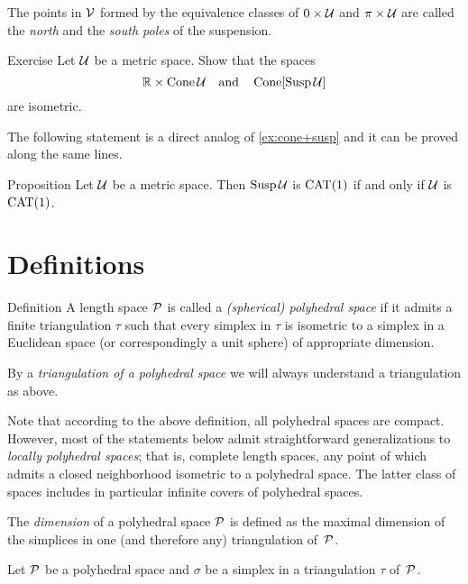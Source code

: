 The points in $\mathcal{V}$ formed by the equivalence classes of $0\times\mathcal{U}$ and $\pi\times\mathcal{U}$ are called  the \emph{north} and the  \emph{south poles} of the suspension.

\begin{thm}{Exercise}\label{ex:product-cone}
Let $\mathcal{U}$ be a metric space.
Show that the spaces 
\[\mathbb{R}\times \mathop{\rm Cone}\nolimits\mathcal{U}\quad\text{and}\quad\mathop{\rm Cone}\nolimits[\mathop{\rm Susp}\nolimits\mathcal{U}]\]
are  isometric.
\end{thm}

The following statement is a direct analog of \ref{ex:cone+susp} and it can be proved along the same lines.

\begin{thm}{Proposition}\label{prop:susp}
Let $\mathcal{U}$ be a metric space.
Then $\mathop{\rm Susp}\nolimits\mathcal{U}$ is  $\mathrm{CAT}(1)$ if and only if $\mathcal{U}$ is $\mathrm{CAT}(1)$.
\end{thm}


\section{Definitions}

\begin{thm}{Definition}\label{def:poly}
A length space $\mathcal{P}$ is called  
a \emph{(spherical) polyhedral space} 
if it admits a finite triangulation $\tau$ 
such that every simplex in $\tau$ is isometric to a simplex in a Euclidean space (or correspondingly a unit sphere) of appropriate dimension.

By a 
\emph{triangulation of a polyhedral space} 
we will always understand a triangulation as above. 
\end{thm}

Note that according to the above definition,
all polyhedral spaces are compact.
However, 
most of the statements below admit straightforward generalizations 
to \emph{locally polyhedral spaces};
that is, complete length spaces,  
any point of which admits a closed neighborhood isometric to a polyhedral space.
The latter class of spaces includes in particular infinite covers of polyhedral spaces.

The \emph{dimension} of a polyhedral space $\mathcal{P}$
is defined as the maximal dimension of the simplices 
in one (and therefore any) triangulation of~$\mathcal{P}$.

Let $\mathcal{P}$ be a polyhedral space
and $\sigma$ be a simplex in a triangulation $\tau$ of~$\mathcal{P}$.

